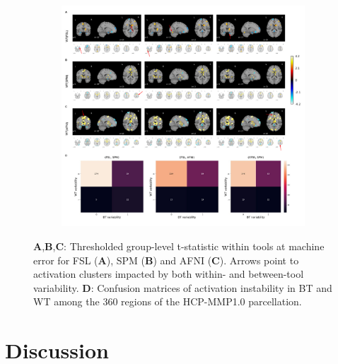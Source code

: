 \documentclass[11pt,onecolumn]{article}
\begin{document}

\begin{figure}[ht]
  \begin{subfigure}[ht]{\textwidth}
    \centering
    \includegraphics[width=\textwidth]{figures/act_deact-marked.pdf}
  \end{subfigure}
  \centering
  \caption{\textbf{A},\textbf{B},\textbf{C}: Thresholded group-level
    t-statistic within tools at machine error for FSL (\textbf{A}), SPM
    (\textbf{B}) and AFNI (\textbf{C}). Arrows point to activation clusters
    impacted by both within- and between-tool variability.
     \textbf{D}: Confusion matrices of
    activation instability in BT and WT among the 360 regions of the
    HCP-MMP1.0 parcellation.}
  \label{fig:thresh-maps}
\end{figure}


\section{Discussion}
\end{document}
